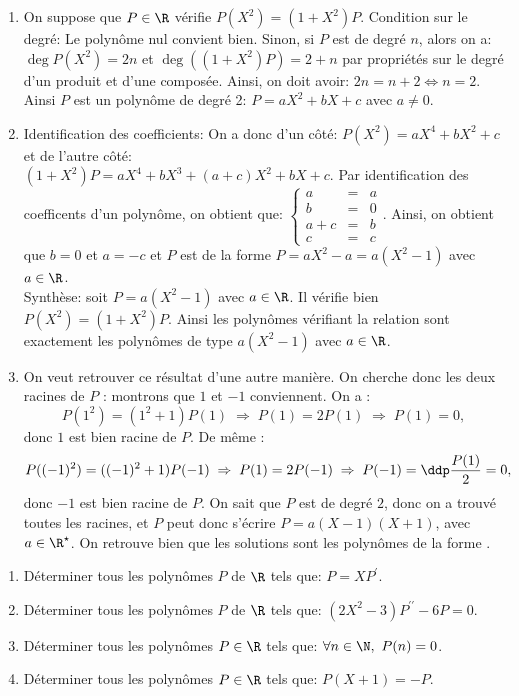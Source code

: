 \documentclass[a4paper, 11pt,reqno]{article}
\begin{document}
\begin{correction}  \;
	\begin{enumerate}
		\item On suppose que $P\in\R$ v\'erifie $P(X^2)=(1+X^2)P$. Condition sur le degr\'e: Le polyn\^{o}me nul convient bien. Sinon, si $P$ est de degr\'e $n$, alors on a: $\deg{P(X^2)}=2n$ et $\deg{( (1+X^2)P )}=2+n$ par propri\'et\'es sur le degr\'e d'un produit et d'une compos\'ee. Ainsi, on doit avoir: $2n=n+2\Leftrightarrow n=2$. Ainsi $P$ est un polyn\^{o}me de degr\'e 2: $P=aX^2+bX+c$ avec $a\not= 0$.
		\item Identification des coefficients: On a donc d'un c\^{o}t\'e: $P(X^2)=aX^4+bX^2+c$ et de l'autre c\^{o}t\'e:\\ \noindent $(1+X^2)P=aX^4+bX^3+(a+c)X^2+bX+c$. Par identification des coefficents d'un polyn\^{o}me, on obtient que: $\left\lbrace\begin{array}{lll} a&=&a\\b&=&0\\a+c&=&b\\c&=&c  \end{array}\right.$. Ainsi, on obtient que $b=0$ et $a=-c$ et $P$ est de la forme $P=aX^2-a=a(X^2-1)$ avec $a\in\R$.\\
		      Synth\`{e}se: soit $P=a(X^2-1)$ avec $a\in\R$. Il v\'erifie bien $P(X^2)=(1+X^2)P$. Ainsi les polyn\^{o}mes v\'erifiant la relation sont exactement les polyn\^{o}mes de type $a(X^2-1)$ avec $a\in\R$.
		\item On veut retrouver ce r\'esultat d'une autre mani\`ere. On cherche donc les deux racines de $P$ : montrons que $1$ et $-1$ conviennent. On a :
		      $$P(1^2) = (1^2+1)P(1) \; \Rightarrow \; P(1) = 2P(1) \; \Rightarrow \; P(1) = 0,$$
		      donc $1$ est bien racine de $P$. De m\^eme :
		      $$P((-1)^2) = ((-1)^2+1)P(-1) \; \Rightarrow \; P(1) = 2P(-1) \; \Rightarrow \; P(-1) = \ddp \frac{P(1)}{2} = 0,$$
		      donc $-1$ est bien racine de $P$. On sait que $P$ est de degr\'e $2$, donc on a trouv\'e toutes les racines, et $P$ peut donc s'\'ecrire $P= a (X-1)(X+1)$, avec $a \in \R^\star$. On retrouve bien que les solutions sont les polyn\^omes de la forme .
	\end{enumerate}
\end{correction}
\begin{exercice}  \;
	\begin{enumerate}
		\item D\'eterminer tous les polyn\^omes $P$ de $\R$ tels que: $P=XP^{\prime}.$
		\item D\'eterminer tous les polyn\^omes $P$ de $\R$ tels que: $(2X^2-3)P^{\prime\prime}-6P=0.$
		\item D\'eterminer tous les polyn\^{o}mes $P\in\R$ tels que: $\forall n\in\N,\ P(n)=0$.
		\item D\'eterminer tous les polyn\^{o}mes $P\in\R$ tels que: $P(X+1)=-P$.
	\end{enumerate}
\end{exercice}
\end{document}
